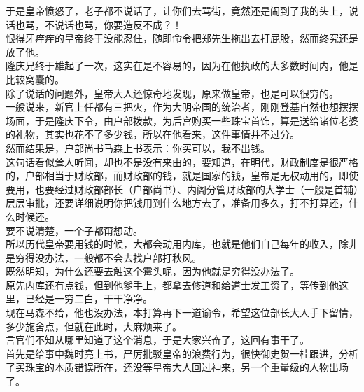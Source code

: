 \begin{multicols}{\theparacolNo}
于是皇帝愤怒了，老子都不说话了，让你们去骂街，竟然还是闹到了我的头上，说话也骂，不说话也骂，你要造反不成？！\\

恨得牙痒痒的皇帝终于没能忍住，随即命令把郑先生拖出去打屁股，然而终究还是放了他。\\

隆庆兄终于雄起了一次，这实在是不容易的，因为在他执政的大多数时间内，他是比较窝囊的。\\

除了说话的问题外，皇帝大人还惊奇地发现，原来做皇帝，也是可以很穷的。\\

一般说来，新官上任都有三把火，作为大明帝国的统治者，刚刚登基自然也想摆摆场面，于是隆庆下令，由户部拨款，为后宫购买一些珠宝首饰，算是送给诸位老婆的礼物，其实也花不了多少钱，所以在他看来，这件事情并不过分。\\

然而结果是，户部尚书马森上书表示：你买可以，我不出钱。\\

这句话看似耸人听闻，却也不是没有来由的，要知道，在明代，财政制度是很严格的，户部相当于财政部，而财政部的钱，就是国家的钱，皇帝是无权动用的，即使要用，也要经过财政部部长（户部尚书）、内阁分管财政部的大学士（一般是首辅）层层审批，还要详细说明你把钱用到什么地方去了，准备用多久，打不打算还，什么时候还。\\

要不说清楚，一个子都甭想动。\\

所以历代皇帝要用钱的时候，大都会动用内库，也就是他们自己每年的收入，除非是穷得没办法，一般都不会去找户部打秋风。\\

既然明知，为什么还要去触这个霉头呢，因为他就是穷得没办法了。\\

原先内库还有点钱，但到他爹手上，都拿去修道和给道士发工资了，等传到他这里，已经是一穷二白，干干净净。\\

现在马森不给，他也没办法，本打算再下一道谕令，希望这位部长大人手下留情，多少施舍点，但就在此时，大麻烦来了。\\

言官们不知从哪里知道了这个消息，于是大家兴奋了，这回有事干了。\\

首先是给事中魏时亮上书，严厉批驳皇帝的浪费行为，很快御史贺一桂跟进，分析了买珠宝的本质错误所在，还没等皇帝大人回过神来，另一个重量级的人物出场了。\\


\end{multicols}
